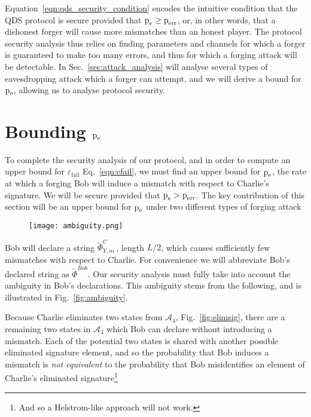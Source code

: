 Equation~\ref{eqn:qds_security_condition} encodes the intuitive condition that the QDS protocol is secure provided that $\text{p}_{\text{e}} \ge \text{p}_{\text{err}}$, or, in other words, that a dishonest forger will cause more mismatches than an honest player. The protocol security analysis thus relies on finding parameters and channels for which a forger is guaranteed to make too many errors, and thus for which a forging attack will be detectable. In Sec.~\ref{sec:attack_analysis} will analyse several types of eavesdropping attack which a forger can attempt, and we will derive a bound for $\text{p}_{\text{e}}$, allowing us to analyse protocol security.




\section{Bounding $\text{p}_{\text{e}}$}
To complete the security analysis of our protocol, and in order to compute an upper bound for $\varepsilon_{\text{fail}}$ Eq.~\ref{eqn:efail}, we must find an upper bound for $\text{p}_{\text{e}}$, the rate at which a forging Bob will induce a mismatch with respect to Charlie's signature. We will be secure provided that $\text{p}_{\text{e}} > \text{p}_{\text{err}}$. The key contribution of this section will be an upper bound for $\text{p}_{\text{e}}$ under two different types of forging attack



\begin{figure}[htp]
\centering
\texttt{[image: ambiguity.png]}
\end{figure}

Bob will declare a string $\tilde{\Phi}_{Y, m^\prime}^C$, length $L/2$,  which causes sufficiently few mismatches with respect to Charlie. For convenience we will abbreviate Bob's declared string as $\tilde{\Phi}^{Bob}$. Our security analysis must fully take into account the ambiguity in Bob's declarations. This ambiguity stems from the following, and is illustrated in Fig.~\ref{fig:ambiguity}.

Because Charlie eliminates two states from $\mathcal{A}_4$, Fig.~\ref{fig:elimsig}, there are a remaining two states in $\mathcal{A}_4$ which Bob can declare without introducing a mismatch. Each of the potential two states is shared with another possible eliminated signature element, and so the probability that Bob induces a mismatch is \emph{not equivalent} to the probability that Bob misidentifies an element of Charlie's eliminated signature\footnote{And so a Helstrom-like approach  will not work.}

